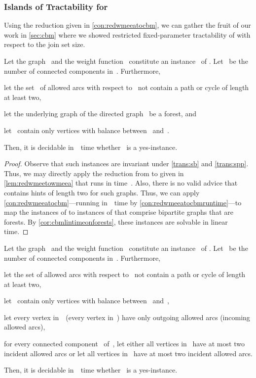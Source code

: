 \subsubsection{Islands of Tractability for  \pWMEEs}\label{sec:tractislands}
Using the reduction given in \autoref{con:redwmeeatocbm}, we can gather the fruit of our work in \autoref{sec:cbm} where we showed restricted fixed-parameter tractability of \pCBMs{} with respect to the join set size.
\begin{corollary}\label{cor:wmeetractableforests}
  Let the graph~ and the weight function~ constitute an instance~ of \pWMEEs{}. Let~ be the number of connected components in~. Furthermore, 
\begin{lemenum}
\item let the set~ of allowed arcs with respect to~ not contain a path or cycle of length at least two,
\item let the underlying graph of the directed graph~ be a forest, and
\item let~ contain only vertices with balance between~ and~.
\end{lemenum}
Then, it is decidable in~~time whether~ is a yes-instance.
\end{corollary}
\begin{proof}
  Observe that such instances are invariant under \autoref{trans:sb} and \autoref{trans:spp}. Thus, we may directly apply the reduction from \pWMEEs{} to \pWMEECAs{} given in \autoref{lem:redwmeetowmeea} that runs in time~. Also, there is no valid advice that contains hints of length two for such graphs. Thus, we can apply \autoref{con:redwmeeatocbm}---running in~~time by \autoref{con:redwmeeatocbmruntime}---to map the instances of \pWMEECAs{} to instances of \pCBMs{} that comprise bipartite graphs that are forests. By \autoref{cor:cbmlintimeonforests}, these instances are solvable in linear time.
\end{proof}
\begin{corollary}\label{cor:wmeetractablecycles}

  Let the graph~ and the weight function~ constitute an instance~ of \pWMEEs{}. Let~ be the number of connected components in~. Furthermore, 
\begin{lemenum}
\item let the set of allowed arcs with respect to~ not contain a path or cycle of length at least two,
\item let~ contain only vertices with balance between~ and~,
\item let every vertex in~~(every vertex in~) have only outgoing allowed arcs (incoming allowed arcs),
\item for every connected component~ of~, let either all vertices in~ have at most two incident allowed arcs or let all vertices in~ have at most two incident allowed arcs.
\end{lemenum}
Then, it is decidable in~~time whether~ is a yes-instance.
\end{corollary}
